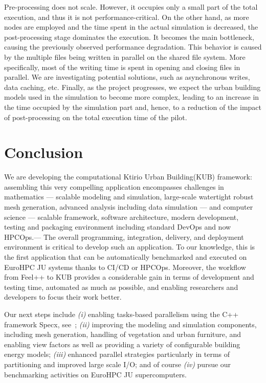 \documentclass[runningheads]{llncs}
\begin{document}
Pre-processing does not scale. However, it occupies only a small part of the total execution, and thus it is not performance-critical. On the other hand, as more nodes are employed and the time spent in the actual simulation is decreased, the post-processing stage dominates the execution. It becomes the main bottleneck, causing the previously observed performance degradation.
This behavior is caused by the multiple files being written in parallel on the shared file system. More specifically, most of the writing time is spent in opening and closing files in parallel. We are investigating potential solutions, such as asynchronous writes, data caching, etc. Finally, as the project progresses, we expect the urban building models used in the simulation to become more complex, leading to an increase in the time occupied by the simulation part and, hence, to a reduction of the impact of post-processing on the total execution time of the pilot.


\section{Conclusion}

We are developing the computational Ktirio Urban Building(KUB) framework: assembling this very compelling application encompasses challenges in mathematics --- scalable modeling and simulation, large-scale watertight robust mesh generation, advanced analysis including data simulation --- and computer science --- scalable framework, software architecture, modern development, testing and packaging environment including standard DevOps and now HPCOps.---
The overall programming, integration, delivery, and deployment environment is critical to develop such an application. To our knowledge, this is the first application that can be automatically benchmarked and executed on EuroHPC JU systems thanks to CI/CD or HPCOps. Moreover, the workflow from Feel++ to KUB provides a considerable gain in terms of development and testing time, automated as much as possible, and enabling researchers and developers to focus their work better.

Our next steps include \textit{(i)} enabling tasks-based parallelism using the C++ framework Specx, see~\cite{cardosi_specx_2022}; \textit{(ii)} improving the modeling and simulation components, including mesh generation, handling of vegetation and urban furniture, and enabling view factors as well as providing a variety of configurable building energy models; \textit{(iii)} enhanced parallel strategies particularly in terms of partitioning and improved large scale I/O; and of course \textit{(iv)} pursue our benchmarking activities on EuroHPC JU supercomputers.
\end{document}
